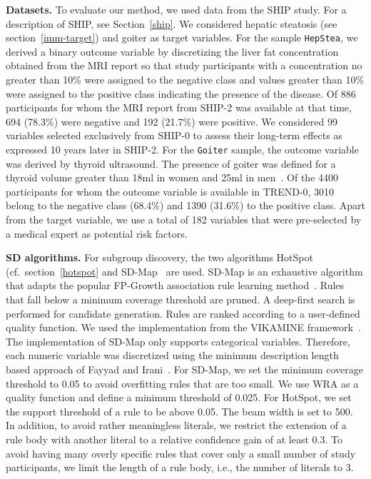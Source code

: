 \documentclass[
  oneside]{book}
\begin{document}
\textbf{Datasets.}
To evaluate our method, we used data from the SHIP study.
For a description of SHIP, see Section~\ref{ship}.
We considered hepatic steatosis (see section~\ref{imm-target}) and goiter as target variables.
For the sample \texttt{HepStea}, we derived a binary outcome variable by discretizing the liver fat concentration obtained from the MRI report so that study participants with a concentration no greater than 10\% were assigned to the negative class and values greater than 10\% were assigned to the positive class indicating the presence of the disease.
Of 886 participants for whom the MRI report from SHIP-2 was available at that time, 694 (78.3\%) were negative and 192 (21.7\%) were positive.
We considered 99 variables selected exclusively from SHIP-0 to assess their long-term effects as expressed 10 years later in SHIP-2.
For the \texttt{Goiter} sample, the outcome variable was derived by thyroid ultrasound.
The presence of goiter was defined for a thyroid volume greater than 18ml in women and 25ml in men~\autocite{Gutekunst:88}.
Of the 4400 participants for whom the outcome variable is available in TREND-0, 3010 belong to the negative class (68.4\%) and 1390 (31.6\%) to the positive class.
Apart from the target variable, we use a total of 182 variables that were pre-selected by a medical expert as potential risk factors.

\textbf{SD algorithms.}
For subgroup discovery, the two algorithms HotSpot~\autocite{Hall:Weka09} (cf.~section~\ref{hotspot} and SD-Map~\autocite{Atzmueller:SD-Map:06} are used.
SD-Map is an exhaustive algorithm that adapts the popular FP-Growth association rule learning method~\autocite{Han:FPGrowth00}.
Rules that fall below a minimum coverage threshold are pruned.
A deep-first search is performed for candidate generation.
Rules are ranked according to a user-defined quality function.
We used the implementation from the VIKAMINE framework~\autocite{Atzmueller:VIKAMINE12}.
The implementation of SD-Map only supports categorical variables.
Therefore, each numeric variable was discretized using the minimum description length based approach of Fayyad and Irani~\autocite{Fayyad:MDL93}.
For SD-Map, we set the minimum coverage threshold to 0.05 to avoid overfitting rules that are too small.
We use WRA as a quality function and define a minimum threshold of 0.025.
For HotSpot, we set the support threshold of a rule to be above 0.05.
The beam width is set to 500.
In addition, to avoid rather meaningless literals, we restrict the extension of a rule body with another literal to a relative confidence gain of at least 0.3.
To avoid having many overly specific rules that cover only a small number of study participants, we limit the length of a rule body, i.e., the number of literals to 3.
\end{document}
